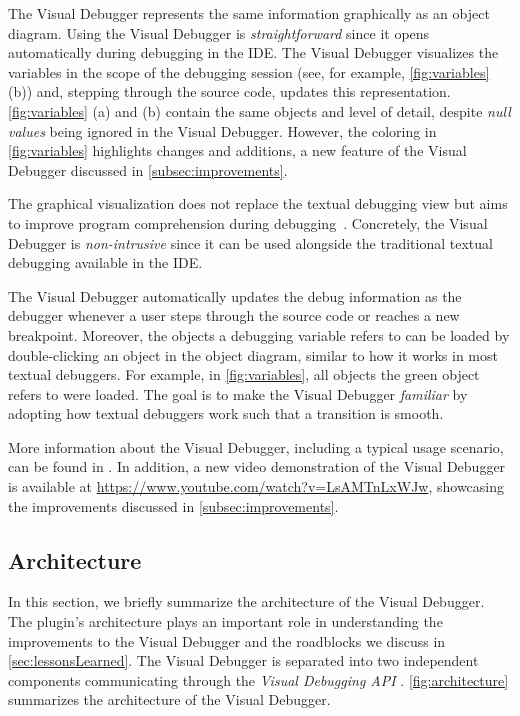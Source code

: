 \documentclass[sigconf]{acmart}
\begin{document}
The Visual Debugger represents the same information graphically as an object diagram.
Using the Visual Debugger is \textit{straightforward} since it opens automatically during debugging in the IDE.
The Visual Debugger visualizes the variables in the scope of the debugging session (see, for example, \autoref{fig:variables} (b)) and, stepping through the source code, updates this representation.
\autoref{fig:variables} (a) and (b) contain the same objects and level of detail, despite \textit{null values} being ignored in the Visual Debugger.
However, the coloring in \autoref{fig:variables} highlights changes and additions, a new feature of the Visual Debugger discussed in \autoref{subsec:improvements}.

The graphical visualization does not replace the textual debugging view but aims to improve program comprehension during debugging~\cite{krauterVisualDebuggerTool2022}.
Concretely, the Visual Debugger is \textit{non-intrusive} since it can be used alongside the traditional textual debugging available in the IDE.

The Visual Debugger automatically updates the debug information as the \intellij{} debugger whenever a user steps through the source code or reaches a new breakpoint.
Moreover, the objects a debugging variable refers to can be loaded by double-clicking an object in the object diagram, similar to how it works in most textual debuggers.
For example, in \autoref{fig:variables}, all objects the green object refers to were loaded.
The goal is to make the Visual Debugger \textit{familiar} by adopting how textual debuggers work such that a transition is smooth.

More information about the Visual Debugger, including a typical usage scenario, can be found in \cite{krauterVisualDebuggerTool2022}.
In addition, a new video demonstration of the Visual Debugger is available at \url{https://www.youtube.com/watch?v=LsAMTnLxWJw}, showcasing the improvements discussed in \autoref{subsec:improvements}.

\subsection{Architecture}
In this section, we briefly summarize the architecture of the Visual Debugger.
The plugin's architecture plays an important role in understanding the improvements to the Visual Debugger and the roadblocks we discuss in \autoref{sec:lessonsLearned}.
The Visual Debugger is separated into two independent components communicating through the \textit{Visual Debugging API} \cite{krauterVisualDebuggerTool2022}.
\autoref{fig:architecture} summarizes the architecture of the Visual Debugger.
\end{document}
